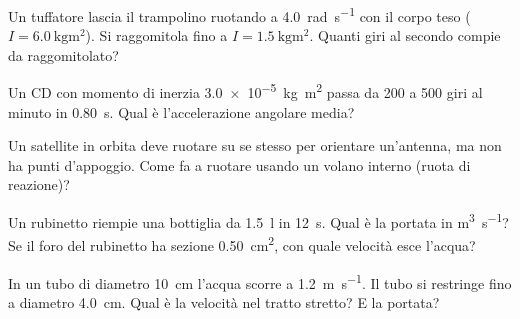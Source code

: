 \begin{esercizio}
Un tuffatore lascia il trampolino ruotando a \SI{4,0}{\radian\per\second} con il corpo teso ($I = \SI{6,0}{\kilogram\metre\squared}$). Si raggomitola fino a $I = \SI{1,5}{\kilogram\metre\squared}$. Quanti giri al secondo compie da raggomitolato?\\
\end{esercizio}

\begin{esercizio}
Un CD con momento di inerzia \SI{3,0e-5}{\kilogram\metre\squared} passa da \SI{200}{} a \SI{500}{} giri al minuto in \SI{0,80}{\second}. Qual è l'accelerazione angolare media?\\
\end{esercizio}

\begin{esercizio}
Un satellite in orbita deve ruotare su se stesso per orientare un'antenna, ma non ha punti d'appoggio. Come fa a ruotare usando un volano interno (ruota di reazione)?\\
\end{esercizio}

\begin{esercizio}
Un rubinetto riempie una bottiglia da \SI{1,5}{\litre} in \SI{12}{\second}. Qual è la portata in \si{\metre\cubed\per\second}? Se il foro del rubinetto ha sezione \SI{0,50}{\centi\metre\squared}, con quale velocità esce l'acqua?\\
\end{esercizio}

\begin{esercizio}
In un tubo di diametro \SI{10}{\centi\metre} l'acqua scorre a \SI{1,2}{\metre\per\second}. Il tubo si restringe fino a diametro \SI{4,0}{\centi\metre}. Qual è la velocità nel tratto stretto? E la portata?\\
\end{esercizio}


